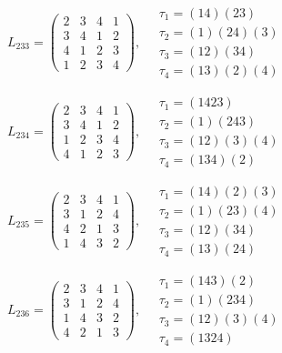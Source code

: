 $L_{233} = \begin{pmatrix} 2 & 3 & 4 & 1 \\ 3 & 4 & 1 & 2 \\ 4 & 1 & 2 & 3 \\ 1 & 2 & 3 & 4 \end{pmatrix}, \quad \begin{matrix} \tau_{1} = (1 4)(2 3) \\ \tau_{2} = (1)(2 4)(3) \\ \tau_{3} = (1 2)(3 4) \\ \tau_{4} = (1 3)(2)(4) \end{matrix}$

$L_{234} = \begin{pmatrix} 2 & 3 & 4 & 1 \\ 3 & 4 & 1 & 2 \\ 1 & 2 & 3 & 4 \\ 4 & 1 & 2 & 3 \end{pmatrix}, \quad \begin{matrix} \tau_{1} = (1 4 2 3) \\ \tau_{2} = (1)(2 4 3) \\ \tau_{3} = (1 2)(3)(4) \\ \tau_{4} = (1 3 4)(2) \end{matrix}$

$L_{235} = \begin{pmatrix} 2 & 3 & 4 & 1 \\ 3 & 1 & 2 & 4 \\ 4 & 2 & 1 & 3 \\ 1 & 4 & 3 & 2 \end{pmatrix}, \quad \begin{matrix} \tau_{1} = (1 4)(2)(3) \\ \tau_{2} = (1)(2 3)(4) \\ \tau_{3} = (1 2)(3 4) \\ \tau_{4} = (1 3)(2 4) \end{matrix}$

$L_{236} = \begin{pmatrix} 2 & 3 & 4 & 1 \\ 3 & 1 & 2 & 4 \\ 1 & 4 & 3 & 2 \\ 4 & 2 & 1 & 3 \end{pmatrix}, \quad \begin{matrix} \tau_{1} = (1 4 3)(2) \\ \tau_{2} = (1)(2 3 4) \\ \tau_{3} = (1 2)(3)(4) \\ \tau_{4} = (1 3 2 4) \end{matrix}$

